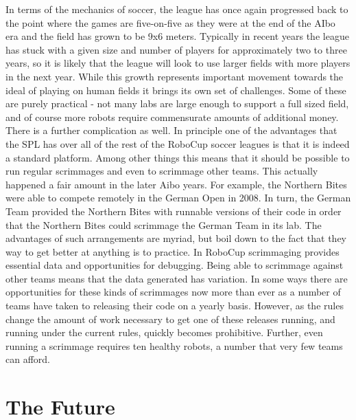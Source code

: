 \documentclass{llncs}
\begin{document}
In terms of the mechanics of soccer, the league has once again progressed
back to the point where the games are five-on-five as they were at
the end of the AIbo era and the field has grown to be 9x6 meters. Typically
in recent years the league has stuck with a given size and number of
players for approximately two to three years, so it is likely that the league
will look to use larger fields with more players in the next year. While this
growth represents important movement towards the ideal of playing
on human fields it brings its own set of challenges. Some of these are
purely practical - not many labs are large enough to support a full sized
field, and of course more robots require commensurate amounts of additional
money. There is a further complication as well. In principle one of the
advantages that the SPL has over all of the rest of the RoboCup soccer
leagues is that it is indeed a standard platform. Among other things this
means that it should be possible to run regular scrimmages and even
to scrimmage other teams. This actually happened a fair amount in the later
Aibo years. For example, the Northern Bites were able to compete remotely
in the German Open in 2008. In turn, the German Team provided the
Northern Bites with runnable versions of their code in order that the Northern
Bites could scrimmage the German Team in its lab. The advantages of
such arrangements are myriad, but boil down to the fact that they way to
get better at anything is to practice. In RoboCup scrimmaging provides
essential data and opportunities for debugging. Being able to scrimmage
against other teams means that the data generated has variation. In some
ways there are opportunities for these kinds of scrimmages now more than
ever as a number of teams have taken to releasing their code on a yearly
basis. However, as the rules change the amount of work necessary to get
one of these releases running, and running under the current rules, quickly becomes prohibitive.
Further, even running a scrimmage requires ten healthy robots, a number
that very few teams can afford.

\section{The Future}
\end{document}

